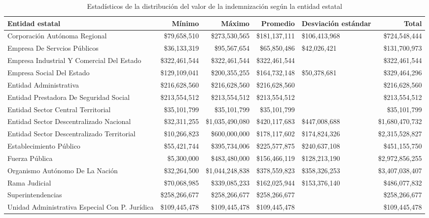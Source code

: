 \begin{table}[htbp]
\centering
\caption{Estadísticos de la distribución del
valor de la indemnización según la entidad estatal} 
\label{tab:indemnizacion-entidad}
\begin{tabular}{lrrrR{2cm}r}
  \hline
Entidad estatal & Mínimo & Máximo & Promedio & Desviación estándar & Total \\ 
  \hline
Corporación Autónoma Regional & \$79,658,510 & \$273,530,565 & \$181,137,111 & \$106,413,968 & \$724,548,444 \\ 
  Empresa De Servcios Públicos & \$36,133,319 & \$95,567,654 & \$65,850,486 & \$42,026,421 & \$131,700,973 \\ 
  Empresa Industrial Y Comercial Del Estado & \$322,461,544 & \$322,461,544 & \$322,461,544 &  & \$322,461,544 \\ 
  Empresa Social Del Estado & \$129,109,041 & \$200,355,255 & \$164,732,148 & \$50,378,681 & \$329,464,296 \\ 
  Entidad Administrativa & \$216,628,560 & \$216,628,560 & \$216,628,560 &  & \$216,628,560 \\ 
  Entidad Prestadora De Seguridad Social & \$213,554,512 & \$213,554,512 & \$213,554,512 &  & \$213,554,512 \\ 
  Entidad Sector Central Territorial & \$35,101,799 & \$35,101,799 & \$35,101,799 &  & \$35,101,799 \\ 
  Entidad Sector Descentralizado Nacional & \$32,311,255 & \$1,035,490,080 & \$420,117,683 & \$447,008,688 & \$1,680,470,732 \\ 
  Entidad Sector Descentralizado Territorial & \$10,266,823 & \$600,000,000 & \$178,117,602 & \$174,824,326 & \$2,315,528,827 \\ 
  Establecimiento Público & \$55,421,744 & \$395,734,006 & \$225,577,875 & \$240,637,108 & \$451,155,750 \\ 
  Fuerza Pública & \$5,300,000 & \$483,480,000 & \$156,466,119 & \$128,213,190 & \$2,972,856,255 \\ 
  Organismo Autónomo De La Nación & \$32,264,500 & \$1,044,248,838 & \$378,559,823 & \$358,326,253 & \$3,407,038,407 \\ 
  Rama Judicial & \$70,068,985 & \$339,085,233 & \$162,025,944 & \$153,376,140 & \$486,077,832 \\ 
  Superintendencias & \$258,266,677 & \$258,266,677 & \$258,266,677 &  & \$258,266,677 \\ 
  Unidad Administrativa Especial Con P. Jurídica & \$109,445,478 & \$109,445,478 & \$109,445,478 &  & \$109,445,478 \\ 
   \hline
\end{tabular}
\end{table}
